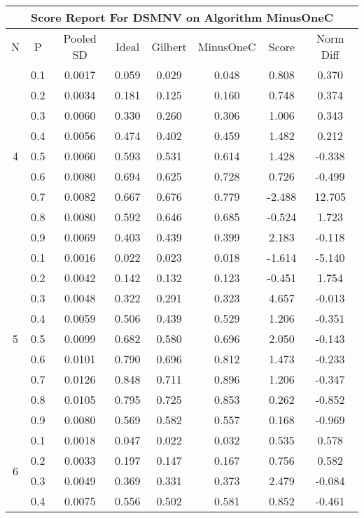 \documentclass[11pt,a4paper]{report}
\begin{document}
\begin{longtable}{ | c | c || c | c | c | c | c | c | }
\hline
\multicolumn{8}{|c|}{ Score Report For DSMNV on Algorithm MinusOneC} \\
\hline
N & P & Pooled SD &  Ideal &  Gilbert & MinusOneC  & Score & Norm Diff \\
 \hline
 \hline
 \endhead
\multirow{9}{*}{4} & 0.1 & 0.0017 & 0.059 & 0.029 & 0.048 & 0.808 & 0.370 \\
 & 0.2 & 0.0034 & 0.181 & 0.125 & 0.160 & 0.748 & 0.374 \\
 & 0.3 & 0.0060 & 0.330 & 0.260 & 0.306 & 1.006 & 0.343 \\
 & 0.4 & 0.0056 & 0.474 & 0.402 & 0.459 & 1.482 & 0.212 \\
 & 0.5 & 0.0060 & 0.593 & 0.531 & 0.614 & 1.428 & -0.338 \\
 & 0.6 & 0.0080 & 0.694 & 0.625 & 0.728 & 0.726 & -0.499 \\
 & 0.7 & 0.0082 & 0.667 & 0.676 & 0.779 & -2.488 & 12.705 \\
 & 0.8 & 0.0080 & 0.592 & 0.646 & 0.685 & -0.524 & 1.723 \\
 & 0.9 & 0.0069 & 0.403 & 0.439 & 0.399 & 2.183 & -0.118 \\
 \hline
\multirow{9}{*}{5} & 0.1 & 0.0016 & 0.022 & 0.023 & 0.018 & -1.614 & -5.140 \\
 & 0.2 & 0.0042 & 0.142 & 0.132 & 0.123 & -0.451 & 1.754 \\
 & 0.3 & 0.0048 & 0.322 & 0.291 & 0.323 & 4.657 & -0.013 \\
 & 0.4 & 0.0059 & 0.506 & 0.439 & 0.529 & 1.206 & -0.351 \\
 & 0.5 & 0.0099 & 0.682 & 0.580 & 0.696 & 2.050 & -0.143 \\
 & 0.6 & 0.0101 & 0.790 & 0.696 & 0.812 & 1.473 & -0.233 \\
 & 0.7 & 0.0126 & 0.848 & 0.711 & 0.896 & 1.206 & -0.347 \\
 & 0.8 & 0.0105 & 0.795 & 0.725 & 0.853 & 0.262 & -0.852 \\
 & 0.9 & 0.0080 & 0.569 & 0.582 & 0.557 & 0.168 & -0.969 \\
 \hline
\multirow{9}{*}{6} & 0.1 & 0.0018 & 0.047 & 0.022 & 0.032 & 0.535 & 0.578 \\
 & 0.2 & 0.0033 & 0.197 & 0.147 & 0.167 & 0.756 & 0.582 \\
 & 0.3 & 0.0049 & 0.369 & 0.331 & 0.373 & 2.479 & -0.084 \\
 & 0.4 & 0.0075 & 0.556 & 0.502 & 0.581 & 0.852 & -0.461 \\

\end{longtable}
\end{document}
